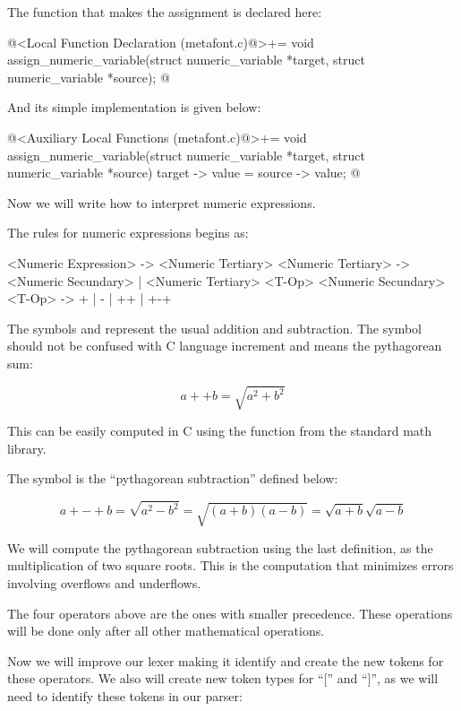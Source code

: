 The function that makes the assignment is declared here:

\iniciocodigo
@<Local Function Declaration (metafont.c)@>+=
void assign_numeric_variable(struct numeric_variable *target,
                            struct numeric_variable *source);
@
\fimcodigo

And its simple implementation is given below:

\iniciocodigo
@<Auxiliary Local Functions (metafont.c)@>+=
void assign_numeric_variable(struct numeric_variable *target,
                            struct numeric_variable *source){
  target -> value = source -> value;
}
@
\fimcodigo

Now we will write how to interpret numeric expressions.


The rules for numeric expressions begins as:

\alinhaverbatim
<Numeric Expression> -> <Numeric Tertiary>
<Numeric Tertiary> -> <Numeric Secundary> |
                      <Numeric Tertiary> <T-Op> <Numeric Secundary>
<T-Op> -> + | - | ++ | +-+
\alinhanormal

The symbols \monoespaco{+} and \monoespaco{-} represent the usual
addition and subtraction. The symbol \monoespaco{++} should not be
confused with C language increment and means the pythagorean sum:

$$
a ++ b = \sqrt{a^2 + b^2}
$$

This can be easily computed in C using the
function  from the standard math library.

The symbol \monoespaco{+-+} is the ``pythagorean subtraction'' defined
below:

$$
a +-+ b = \sqrt{a^2 - b^2} = \sqrt{(a+b)(a-b)} = \sqrt{a+b}\sqrt{a-b}
$$

We will compute the pythagorean subtraction using the last definition,
as the multiplication of two square roots. This is the computation
that minimizes errors involving overflows and underflows.

The four operators above are the ones with smaller precedence. These
operations will be done only after all other mathematical operations.

Now we will improve our lexer making it identify and create the new
tokens for these operators. We also will create new token types for
``['' and ``]'', as we will need to identify these tokens in our
parser:

